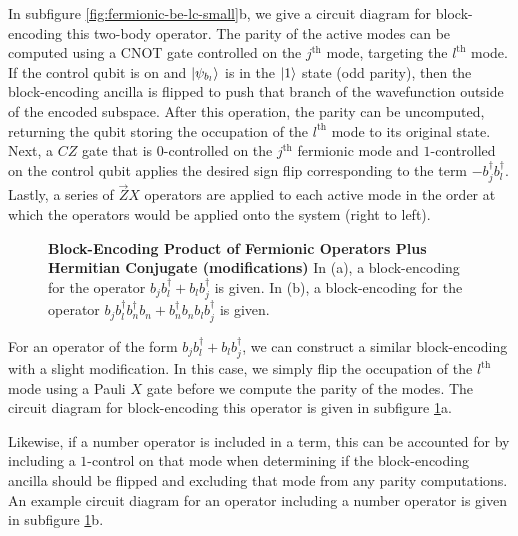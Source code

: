 In subfigure \ref{fig:fermionic-be-lc-small}b, we give a circuit diagram for block-encoding this two-body operator.
The parity of the active modes can be computed using a CNOT gate controlled on the $j^\text{th}$ mode, targeting the $l^\text{th}$ mode.
If the control qubit is on and $\ket{\psi_{b_l}}$ is in the $\ket{1}$ state (odd parity), then the block-encoding ancilla is flipped to push that branch of the wavefunction outside of the encoded subspace.
After this operation, the parity can be uncomputed, returning the qubit storing the occupation of the $l^\text{th}$ mode to its original state.
Next, a $CZ$ gate that is $0$-controlled on the $j^\text{th}$ fermionic mode and $1$-controlled on the control qubit applies the desired sign flip corresponding to the term $- b_j^\dagger b_l^\dagger$.
Lastly, a series of $\vec{Z}X$ operators are applied to each active mode in the order at which the operators would be applied onto the system (right to left).

\begin{figure}
    
    
    \caption{
        \textbf{Block-Encoding Product of Fermionic Operators Plus Hermitian Conjugate (modifications)}
        In (a), a block-encoding for the operator $b_j b_l^\dagger + b_l b_j^\dagger$ is given.
        In (b), a block-encoding for the operator $b_j b_l^\dagger b_n^\dagger b_n + b_n^\dagger b_n b_l b_j^\dagger$ is given.
    }
    \label{fig:fermionic-be-lc-modifications}
\end{figure}

For an operator of the form $b_j b_l^\dagger + b_l b_j^\dagger$, we can construct a similar block-encoding with a slight modification.
In this case, we simply flip the occupation of the $l^\text{th}$ mode using a Pauli $X$ gate before we compute the parity of the modes.
The circuit diagram for block-encoding this operator is given in subfigure \ref{fig:fermionic-be-lc-modifications}a.

Likewise, if a number operator is included in a term, this can be accounted for by including a $1$-control on that mode when determining if the block-encoding ancilla should be flipped and excluding that mode from any parity computations.
An example circuit diagram for an operator including a number operator is given in subfigure \ref{fig:fermionic-be-lc-modifications}b.

